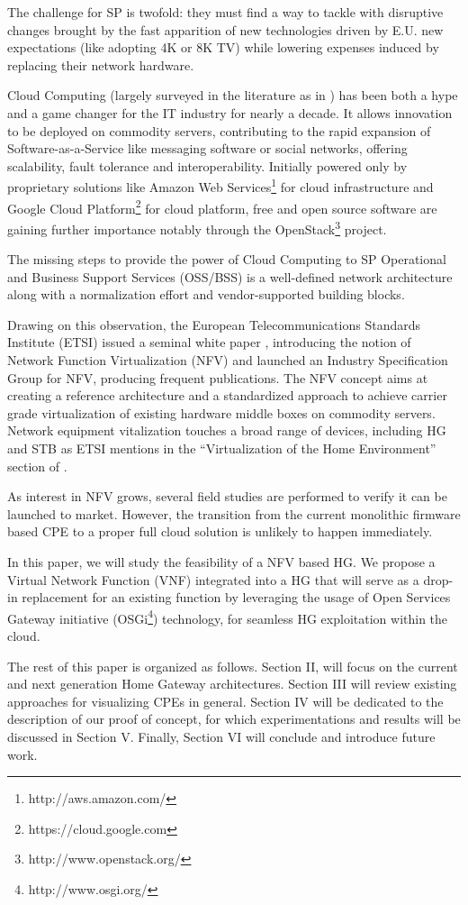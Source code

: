 The challenge for SP is twofold: they must find a way to tackle with disruptive changes brought by the fast apparition of new technologies driven by E.U. new expectations (like adopting 4K or 8K TV) while lowering expenses induced by replacing their network hardware.

Cloud Computing (largely surveyed in the literature as in \cite{rimal_taxonomy_2009}) has been both a hype and a game changer for the IT industry for nearly a decade.
It allows innovation to be deployed on commodity servers, contributing to the rapid expansion of Software-as-a-Service like messaging software or social networks, offering scalability, fault tolerance and interoperability.
Initially powered only by proprietary solutions like Amazon Web Services\footnote{http://aws.amazon.com/} for cloud infrastructure and Google Cloud Platform\footnote{https://cloud.google.com} for cloud platform, free and open source software are gaining further importance notably through the OpenStack\footnote{http://www.openstack.org/} project. 

The missing steps to provide the power of Cloud Computing to SP Operational and Business Support Services (OSS/BSS) is a well-defined network architecture along with a normalization effort and vendor-supported building blocks.

Drawing on this observation, the European Telecommunications Standards Institute (ETSI) issued a seminal white paper \cite{_network_2012}, introducing the notion of Network Function Virtualization (NFV) and launched an Industry Specification Group for NFV, producing frequent publications.
The NFV concept aims at creating a reference architecture and a standardized approach to achieve carrier grade virtualization of existing hardware middle boxes on commodity servers.
Network equipment vitalization touches a broad range of devices, including HG and STB as ETSI mentions in the “Virtualization of the Home Environment” section of \cite{_network_2013}. 

As interest in NFV grows, several field studies are performed to verify it can be launched to market.
However, the transition from the current monolithic firmware based CPE to a proper full cloud solution is unlikely to happen immediately.

In this paper, we will study the feasibility of a NFV based HG. We propose a Virtual Network Function (VNF) integrated into a HG that will serve as a drop-in replacement for an existing function by leveraging the usage of Open Services Gateway initiative (OSGi\footnote{http://www.osgi.org/}) technology, for seamless HG exploitation within the cloud.

The rest of this paper is organized as follows.
Section II, will focus on the current and next generation Home Gateway architectures.
Section III will review existing approaches for visualizing CPEs in general.
Section IV will be dedicated to the description of our proof of concept, for which experimentations and results will be discussed in Section V.
Finally, Section VI will conclude and introduce future work.
